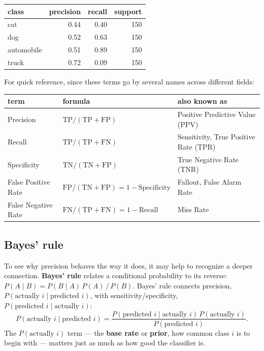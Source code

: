 \begin{center}
\renewcommand{\arraystretch}{1.3}
\begin{tabular}{lrrr}
\hline
\textbf{class} & \textbf{precision} & \textbf{recall} & \textbf{support} \\
\hline
cat        & 0.44 & 0.40 & 150 \\
dog        & 0.52 & 0.63 & 150 \\
automobile & 0.51 & 0.89 & 150 \\
truck      & 0.72 & 0.09 & 150 \\
\hline
\end{tabular}
\end{center}

For quick reference, since these terms go by several names across different fields:

\begin{center}
\renewcommand{\arraystretch}{1.3}
\begin{tabular}{lll}
\hline
\textbf{term} & \textbf{formula} & \textbf{also known as} \\
\hline
Precision            & $\text{TP}/(\text{TP}+\text{FP})$ & Positive Predictive Value (PPV) \\
Recall               & $\text{TP}/(\text{TP}+\text{FN})$ & Sensitivity, True Positive Rate (TPR) \\
Specificity          & $\text{TN}/(\text{TN}+\text{FP})$ & True Negative Rate (TNR) \\
False Positive Rate  & $\text{FP}/(\text{TN}+\text{FP}) = 1-\text{Specificity}$ & Fallout, False Alarm Rate \\
False Negative Rate  & $\text{FN}/(\text{TP}+\text{FN}) = 1-\text{Recall}$ & Miss Rate \\
\hline
\end{tabular}
\end{center}

\subsection*{Bayes' rule}

To see why precision behaves the way it does, it may help to recognize a deeper connection. \textbf{Bayes' rule} relates a conditional probability to its reverse: $P(A\mid B) = P(B\mid A)\,P(A)\,/\,P(B)$. Bayes' rule connects precision, $P(\text{actually }i\mid\text{predicted }i)$, with sensitivity/specificity, $P(\text{predicted }i\mid\text{actually }i)$:
$$P(\text{actually }i\mid\text{predicted }i) = \frac{P(\text{predicted }i\mid\text{actually }i)\,P(\text{actually }i)}{P(\text{predicted }i)}.$$
The $P(\text{actually }i)$ term --- the \textbf{base rate} or \textbf{prior}, how common class $i$ is to begin with --- matters just as much as how good the classifier is.

